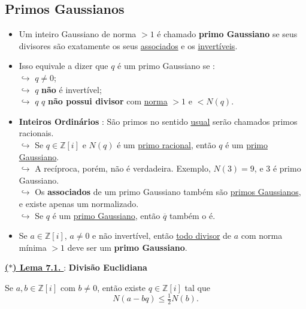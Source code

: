     \subsection{Primos Gaussianos}

    \begin{itemize}[left=0.5cm, align=left, nosep]
        \item Um inteiro Gaussiano de norma $> 1$ é chamado \textbf{primo Gaussiano} se seus divisores são 
        exatamente os seus \underline{associados} e os \underline{invertíveis}.  

        \item Isso equivale a dizer que $q$ é um primo Gaussiano se : \\
            $\hookrightarrow$ $q \neq 0$; \\
            $\hookrightarrow$ $q$ \textbf{não} é invertível; \\
            $\hookrightarrow$ $q$ $q$ \textbf{não possui divisor} com \underline{norma} $>1$ e $< N(q)$.
        
        \item \textbf{Inteiros Ordinários} : São primos no sentido \underline{usual} serão chamados primos racionais. \\
            $\hookrightarrow$ Se $q \in \mathbb{Z}[i]$ e $N(q)$ é um \underline{primo racional}, então $q$ é um \underline{primo Gaussiano}. \\
            $\hookrightarrow$ A recíproca, porém, não é verdadeira. Exemplo, $N(3) = 9$, e $3$ é primo Gaussiano. \\
            $\hookrightarrow$ Os \textbf{associados} de um primo Gaussiano também são \underline{primos Gaussianos}, e existe apenas um normalizado. \\
            $\hookrightarrow$ Se $q$ é um \underline{primo Gaussiano}, então $\overline{q}$ também o é.  
        \item Se $a \in \mathbb{Z}[i]$, $a \neq 0$ e não invertível, então \underline{todo divisor} de $a$ com norma mínima $> 1$ deve ser um \textbf{primo Gaussiano}.  
    \end{itemize}

   
    \underline{\underline{ \textbf{\textcolor{cinzaEscuro}{($\ast$) Lema 7.1.}} }} : \textbf{\textcolor{cinzaEscuro}{Divisão Euclidiana}}
    
        Se $a, b \in \mathbb{Z}[i]$ com $b \neq 0$, então existe $q \in \mathbb{Z}[i]$ tal que
        \[
        N(a - bq) \leq \tfrac{1}{2}N(b).
        \]

